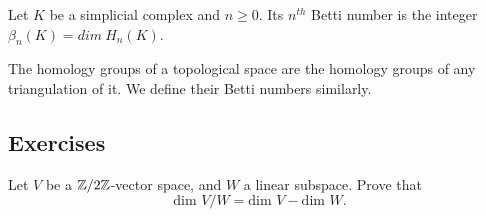\begin{definition}
    Let $K$ be a simplicial complex and $n \ge 0$. Its $n^{th}$ Betti number
    is the integer $\beta_n(K) = dim~ H_n(K)$.
\end{definition}

\begin{definition}
    The homology groups of a topological space are the homology groups of any triangulation of it. We define their Betti numbers similarly.
\end{definition}

\subsection{Exercises}

\begin{exercise}
    Let $V$ be a $\mathbb{Z}/2\mathbb{Z}$-vector space, and $W$ a linear subspace. Prove that
    $$\text{dim } V /W = \text{dim } V - \text{dim } W  .$$
\end{exercise}

